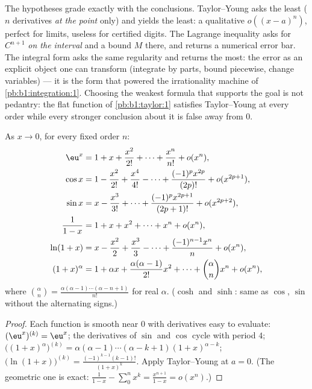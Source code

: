 \begin{remark}
The hypotheses grade exactly with the conclusions.
Taylor--Young asks the least ($n$ derivatives \emph{at the
point} only) and yields the least: a qualitative $o((x-a)^n)$,
perfect for limits, useless for certified digits. The Lagrange
inequality asks for $C^{n+1}$ \emph{on the interval} and a bound
$M$ there, and returns a numerical error bar. The integral form
asks the same regularity and returns the most: the error as an
explicit object one can transform (integrate by parts, bound
piecewise, change variables) --- it is the form that powered the
irrationality machine of \cref{pb:b1:integration:1}. Choosing
the weakest formula that supports the goal is not pedantry: the
flat function of \cref{pb:b1:taylor:1} satisfies Taylor--Young
at every order while every stronger conclusion about it is
false away from $0$.
\end{remark}

\begin{proposition}
As $x \to 0$, for every fixed order $n$:
\begin{align*}
\eu^x &= 1 + x + \frac{x^2}{2!} + \dots + \frac{x^n}{n!} + o(x^n),\\
\cos x &= 1 - \frac{x^2}{2!} + \frac{x^4}{4!} - \dots
+ \frac{(-1)^p x^{2p}}{(2p)!} + o(x^{2p+1}),\\
\sin x &= x - \frac{x^3}{3!} + \dots + \frac{(-1)^p
x^{2p+1}}{(2p+1)!} + o(x^{2p+2}),\\
\frac{1}{1 - x} &= 1 + x + x^2 + \dots + x^n + o(x^n),\\
\ln(1 + x) &= x - \frac{x^2}{2} + \frac{x^3}{3} - \dots +
\frac{(-1)^{n-1} x^n}{n} + o(x^n),\\
(1 + x)^\alpha &= 1 + \alpha x + \frac{\alpha(\alpha-1)}{2!}x^2 +
\dots + \binom{\alpha}{n} x^n + o(x^n),
\end{align*}
where $\binom{\alpha}{n} = \frac{\alpha(\alpha - 1)\cdots(\alpha - n
+ 1)}{n!}$ for real $\alpha$. ($\cosh$ and $\sinh$: same as $\cos$,
$\sin$ without the alternating signs.)
\label{prop:b1:taylor:standard}
\end{proposition}

\begin{proof}
Each function is smooth near $0$ with derivatives easy to evaluate:
$(\eu^x)^{(k)} = \eu^x$; the derivatives of $\sin$ and $\cos$ cycle
with period $4$; $\bigl((1+x)^\alpha\bigr)^{(k)} = \alpha(\alpha -
1)\cdots(\alpha - k + 1)(1+x)^{\alpha - k}$;
$\bigl(\ln(1+x)\bigr)^{(k)} = \frac{(-1)^{k-1}(k-1)!}{(1+x)^k}$.
Apply Taylor--Young at $a = 0$. (The geometric one is exact:
$\frac{1}{1-x} - \sum_0^n x^k = \frac{x^{n+1}}{1 - x} = o(x^n)$.)
\end{proof}

